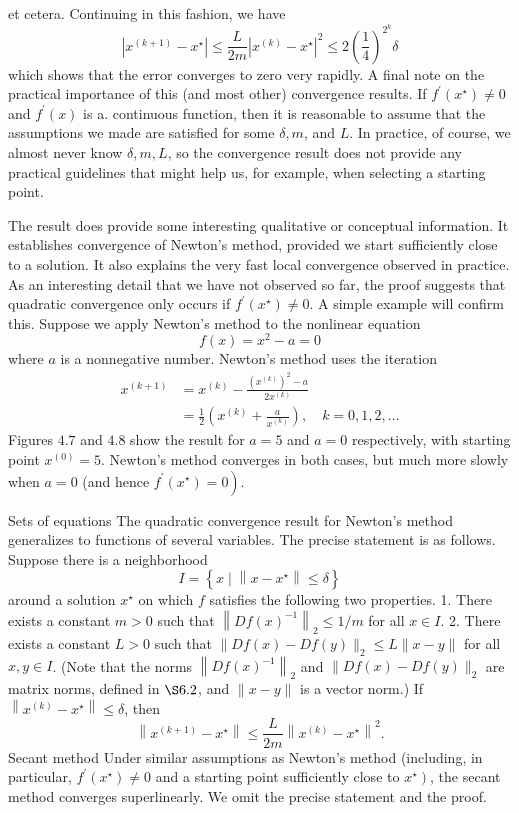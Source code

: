 et cetera. Continuing in this fashion, we have
$$
\left|x^{(k+1)}-x^{\star}\right| \leq \frac{L}{2 m}\left|x^{(k)}-x^{\star}\right|^{2} \leq 2\left(\frac{1}{4}\right)^{2^{k}} \delta
$$
which shows that the error converges to zero very rapidly.
A final note on the practical importance of this (and most other) convergence results. If $ f^{\prime}\left(x^{\star}\right) \neq 0 $ and $ f^{\prime}(x) $ is a. continuous function, then it is reasonable to assume that the assumptions we made are satisfied for some $ \delta, m $, and $ L $. In practice, of course, we almost never know $ \delta, m, L $, so the convergence result does not provide any practical guidelines that might help us, for example, when selecting a starting point.

The result does provide some interesting qualitative or conceptual information. It establishes convergence of Newton's method, provided we start sufficiently close to a solution. It also explains the very fast local convergence observed in practice. As an interesting detail that we have not observed so far, the proof suggests that quadratic convergence only occurs if $ f^{\prime}\left(x^{\star}\right) \neq 0 $. A simple example will confirm this.
Suppose we apply Newton's method to the nonlinear equation
$$
f(x)=x^{2}-a=0
$$
where $ a $ is a nonnegative number. Newton's method uses the iteration
$$
\begin{aligned}
x^{(k+1)} &=x^{(k)}-\frac{\left(x^{(k)}\right)^{2}-a}{2 x^{(k)}} \\
&=\frac{1}{2}\left(x^{(k)}+\frac{a}{x^{(k)}}\right), \quad k=0,1,2, \ldots
\end{aligned}
$$
Figures $ 4.7 $ and $ 4.8 $ show the result for $ a=5 $ and $ a=0 $ respectively, with starting point $ x^{(0)}=5 $. Newton's method converges in both cases, but much more slowly when $ a=0 $ (and hence $ \left.f^{\prime}\left(x^{\star}\right)=0\right) $.

Sets of equations The quadratic convergence result for Newton's method generalizes to functions of several variables. The precise statement is as follows. Suppose there is a neighborhood
$$
I=\left\{x \mid\left\|x-x^{\star}\right\| \leq \delta\right\}
$$
around a solution $ x^{\star} $ on which $ f $ satisfies the following two properties.
1. There exists a constant $ m>0 $ such that $ \left\|D f(x)^{-1}\right\|_{2} \leq 1 / m $ for all $ x \in I $.
2. There exists a constant $ L>0 $ such that $ \|D f(x)-D f(y)\|_{2} \leq L\|x-y\| $ for all $ x, y \in I $.
(Note that the norms $ \left\|D f(x)^{-1}\right\|_{2} $ and $ \|D f(x)-D f(y)\|_{2} $ are matrix norms, defined in $ \S 6.2 $, and $ \|x-y\| $ is a vector norm.) If $ \left\|x^{(k)}-x^{\star}\right\| \leq \delta $, then
$$
\left\|x^{(k+1)}-x^{\star}\right\| \leq \frac{L}{2 m}\left\|x^{(k)}-x^{\star}\right\|^{2} .
$$
Secant method Under similar assumptions as Newton's method (including, in particular, $ f^{\prime}\left(x^{\star}\right) \neq 0 $ and a starting point sufficiently close to $ \left.x^{\star}\right) $, the secant method converges superlinearly. We omit the precise statement and the proof.